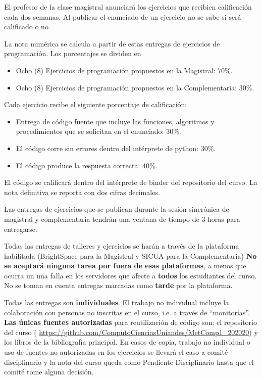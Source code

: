\documentclass[letterpaper,10pt,onecolumn]{article}
\begin{document}
El profesor de la clase magistral anunciar\'a los ejercicios que
recibien calificaci\'on cada dos semanas.
Al publicar el enunciado de un ejercicio no se sabe si ser\'a
calificado o no.

La nota num\'erica se calcula a partir de estas entregas de ejercicios de
programaci\'on. Los porcentajes se dividen en

\begin{itemize}
    \item Ocho (8) Ejercicios de programaci\'on propuestos en la
      Magistral: $70\%$.   
    \item Ocho (8) Ejercicios de programaci\'on propuestos en la
      Complementaria: $30\%$.  
\end{itemize}


Cada ejercicio recibe el siguiente porcentaje de calificaci\'on:
\begin{itemize}
\item Entrega de c\'odigo fuente que incluye las funciones, algoritmos
  y procedimientos que se solicitan en el enunciado: $30\%$.  
\item El c\'odigo corre sin errores dentro del int\'erprete de python: $30\%$.
\item El c\'odigo produce la respuesta correcta: $40\%$.
\end{itemize}
El c\'odigo se calificar\'a dentro del int\'erprete de binder del
repositorio del curso.
La nota definitiva se reporta con dos cifras decimales.

Las entregas de ejercicios que se publican durante la sesi\'on
sincr\'onica de magistral y complementaria tendr\'an una ventana de
tiempo de 3 horas para entregarse.

Todas las entregas de talleres y ejercicios se har\'an a trav\'es de 
la plataforma habilitada (BrightSpace para la Magistral y SICUA para
la Complementaria)
{\bf No se aceptar\'a ninguna tarea por fuera de esas plataformas}, a
menos que ocurra un una falla en los servidores que afecte a {\bf todos} los
estudiantes del curso. 
No se toman en cuenta entregas marcadas como {\bf tarde} por la plataforma. 

Todas las entregas son \textbf{individuales}.  
El trabajo no individual incluye la colaboraci\'on con
personas no inscritas en el curso, i.e. a 
trav\'es de ``monitor\'ias''.
\textbf{Las \'unicas fuentes autorizadas} para reutilizaci\'on de c\'odigo son:
el repositorio del curso (
\url{https://github.com/ComputoCienciasUniandes/MetComp1_202020}) y
los libros de la bibliograf\'ia principal.
En casos de copia, trabajo no individual o uso de fuentes no
autorizadas en los ejercicios se llevar\'a el caso a comit\'e
disciplinario y la nota del curso queda como Pendiente Disciplinario
hasta que el comit\'e tome alguna decisi\'on. 
\end{document}
